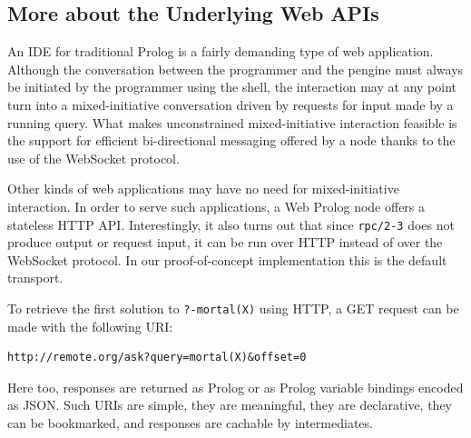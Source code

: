 \documentclass{tlp}
\begin{document}

\vspace{-2mm}

\subsection{More about the Underlying Web APIs}

An IDE for traditional Prolog is a fairly demanding type of web application. Although the conversation between the programmer and the pengine must always be initiated by the programmer using the shell, the interaction may at any point turn into a mixed-initiative conversation driven by requests for input made by a running query. What makes unconstrained mixed-initiative interaction feasible is the support for efficient bi-directional messaging offered by a node thanks to the use of the WebSocket protocol.

Other kinds of web applications may have no need for mixed-initiative interaction. In order to serve such applications, a Web Prolog node offers a stateless HTTP API. Interestingly, it also turns out that since \texttt{rpc/2-3} does not produce output or request input, it can be run over HTTP instead of over the WebSocket protocol. In our proof-of-concept implementation this is the default transport.



To retrieve the first solution to \texttt{?-mortal(X)} using HTTP, a GET request can be made with the following URI:

\vspace{-1mm}
\begin{lstlisting}
http://remote.org/ask?query=mortal(X)&offset=0 
\end{lstlisting}

\vspace{-1mm}
\noindent Here too, responses are returned as Prolog or as Prolog variable bindings encoded as JSON. Such URIs are simple, they are meaningful, they are declarative, they can be bookmarked, and responses are cachable by intermediates. 
\end{document}
